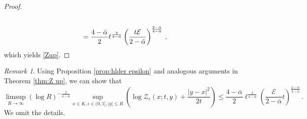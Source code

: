 \documentclass[12pt,reqno]{amsart}
\theoremstyle{remark}
\newtheorem{remark}[theorem]{Remark}
\newcommand{\1}{\mathbf{1}}
\def\Z{\mathcal{Z}}
\def\cee{{\mathcal E}}
\def\lt{\left}
\def\rt{\right}
\begin{document}
\begin{proof}
\begin{align}
		\notag\\&=\frac{4- \bar\alpha}2\ell^{\frac2{4- \bar\alpha}} \lt(\frac{t\cee}{2- \bar\alpha} \rt)^{\frac{2- \bar\alpha}{4- \bar\alpha}}\,,
	\end{align}
	which yields \eqref{Zup}.
	\end{proof}
	\begin{remark}\label{rmk: Z epsilon up}
	Using Proposition \ref{prop:hlder epsilon} and analogous arguments in Theorem \ref{thm:Z up}, we can show that 
	\begin{equation}
			\limsup_{R\to\infty}(\log R)^{-\frac2{4- \bar\alpha}}\sup_{x\in K, \epsilon \in (0,1], |y|\le R}\lt(\log \Z_{\epsilon}(x;t,y)+\frac{|y-x|^2}{2t} \rt)\le \frac{4- \bar\alpha}2\ell^{\frac2{4-\bar \alpha}}\lt(\frac{\cee}{2- \bar\alpha}t\rt)^{\frac{2- \bar\alpha}{4- \bar\alpha}}\,.
		\end{equation}
		We omit the details. 	
	\end{remark}

\end{document}
